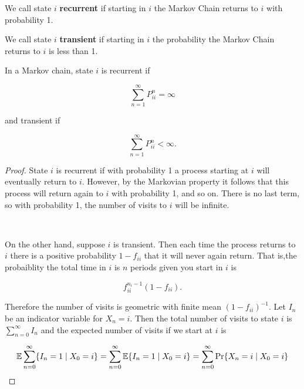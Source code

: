 \begin{definition} We call state \(i\) \textbf{recurrent} if starting in \(i\) the Markov Chain returns to \(i\) with probability 1.

\end{definition}

\begin{definition} We call state \(i\) \textbf{transient} if starting in \(i\) the probability the Markov Chain returns to \(i\) is less than 1.

\end{definition}

\begin{proposition} In a Markov chain, state \(i\) is recurrent if 

\[
\sum_{n=1}^\infty P_{ii}^n = \infty
\]

and transient if

\[
\sum_{n=1}^\infty P_{ii}^n < \infty.
\]

\end{proposition}

\begin{proof}State \(i\) is recurrent if with probability 1 a process starting at \(i\) will eventually return to \(i\). However, by the Markovian property it follows that this process will return again to \(i\) with probability 1, and so on. There is no last term, so with probability 1, the number of visits to \(i\) will be infinite. 

\

On the other hand, suppose \(i\) is transient. Then each time the process returns to \(i\) there is a positive probability \(1 - f_{ii}\) that it will never again return. That is,the probaiblity the total time in \(i\) is \(n\) periods given you start in \(i\) is 

\[
f_{ii}^{n_i-1}(1 - f_{ii}).
\]

Therefore the number of visits is geometric with finite mean \((1 - f_{ii})^{-1}\). Let \(I_n\) be an indicator variable for \(X_n = i\). Then the total number of visits to state \(i\) is \(\sum_{n=0}^\infty I_n\) and the expected number of visits if we start at \(i\) is 

\[
\E \sum_{n=0}^\infty \{I_n = 1 \mid X_0 = i\} =  \sum_{n=0}^\infty \E \{I_n = 1 \mid X_0 = i\} =  \sum_{n=0}^\infty \Pr \{X_n = i \mid X_0 = i\}
\]

\end{proof}

